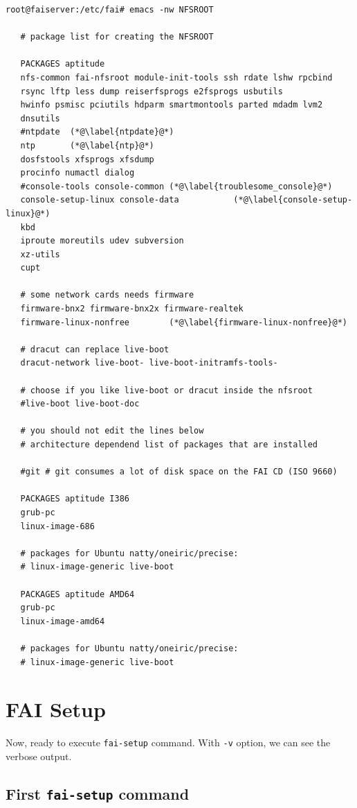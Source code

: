 \documentclass[11pt
  , a4paper
  , article
  , oneside
]{memoir}
\begin{document}
\begin{lstlisting}[style=termstylenumber, caption={Editing \texttt{/etc/fai/NFSROOT}}, label={list:nfsroot-file}]
root@faiserver:/etc/fai# emacs -nw NFSROOT 

   # package list for creating the NFSROOT

   PACKAGES aptitude
   nfs-common fai-nfsroot module-init-tools ssh rdate lshw rpcbind
   rsync lftp less dump reiserfsprogs e2fsprogs usbutils
   hwinfo psmisc pciutils hdparm smartmontools parted mdadm lvm2
   dnsutils
   #ntpdate  (*@\label{ntpdate}@*) 
   ntp       (*@\label{ntp}@*) 
   dosfstools xfsprogs xfsdump
   procinfo numactl dialog
   #console-tools console-common (*@\label{troublesome_console}@*) 
   console-setup-linux console-data           (*@\label{console-setup-linux}@*) 
   kbd
   iproute moreutils udev subversion
   xz-utils
   cupt

   # some network cards needs firmware
   firmware-bnx2 firmware-bnx2x firmware-realtek
   firmware-linux-nonfree        (*@\label{firmware-linux-nonfree}@*) 

   # dracut can replace live-boot
   dracut-network live-boot- live-boot-initramfs-tools-

   # choose if you like live-boot or dracut inside the nfsroot
   #live-boot live-boot-doc

   # you should not edit the lines below
   # architecture dependend list of packages that are installed

   #git # git consumes a lot of disk space on the FAI CD (ISO 9660)

   PACKAGES aptitude I386
   grub-pc
   linux-image-686

   # packages for Ubuntu natty/oneiric/precise:
   # linux-image-generic live-boot

   PACKAGES aptitude AMD64
   grub-pc
   linux-image-amd64

   # packages for Ubuntu natty/oneiric/precise:
   # linux-image-generic live-boot
\end{lstlisting}


\section{FAI Setup}

Now, ready to execute \texttt{fai-setup} command. With \texttt{-v} option, we can see the verbose output.
\subsection{First \texttt{fai-setup} command}
\end{document}
